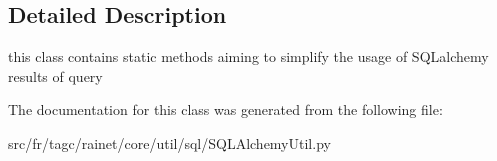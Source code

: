 \subsection{Detailed Description}
this class contains static methods aiming to simplify the usage of S\-Q\-Lalchemy results of query 

The documentation for this class was generated from the following file\-:\begin{DoxyCompactItemize}
\item 
src/fr/tagc/rainet/core/util/sql/S\-Q\-L\-Alchemy\-Util.\-py\end{DoxyCompactItemize}
